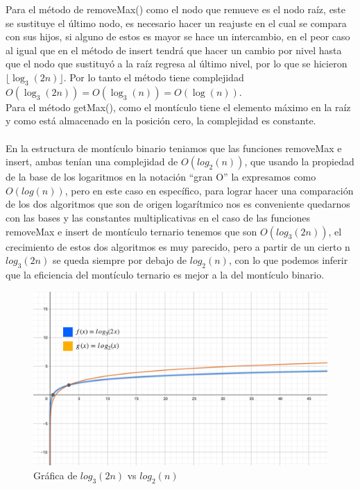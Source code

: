\documentclass[11pt]{article}
\begin{document}
\begin{enumerate}
\begin{itemize}
Para el método de removeMax() como el nodo que remueve es el nodo raíz, este se sustituye el último nodo, es necesario hacer un reajuste en el cual se  compara con sus hijos, si alguno de estos es mayor se hace un intercambio, en el peor caso al igual que en el método de insert tendrá que hacer un cambio por nivel hasta que el nodo que sustituyó a la raíz regresa al último nivel, por lo que se hicieron $\lfloor\log_3(2n)\rfloor$. Por lo tanto el método tiene complejidad $O(\log_3(2n))=O(\log_3(n))=O(\log(n))$. 
\\
Para el método getMax(), como el montículo tiene el elemento máximo en la raíz y como está almacenado en la posición cero, la complejidad es constante.
 \\
 \\En la estructura de montículo binario teniamos que las funciones removeMax e insert, ambas tenían una complejidad de $O(log_2 (n))$, que usando la propiedad de la base de los logaritmos en la notación “gran O”  la expresamos como $O(log(n))$, pero en este caso en específico, para lograr hacer una comparación de los dos algoritmos que son de origen logarítmico nos es conveniente quedarnos con las bases y las constantes multiplicativas en el caso de las funciones removeMax e insert de montículo ternario tenemos que son $O(log_3(2n))$, el crecimiento de estos dos algoritmos es muy parecido, pero a partir de un cierto n $log_3(2n)$ se queda siempre por debajo de $log_2(n)$, con lo que podemos inferir que la eficiencia del montículo ternario es mejor a la del montículo binario. 
 
   \begin{figure}[!h]
        \centering
        \includegraphics[scale=0.3]{IMG-2074 (1).jpg}
        \caption{Gráfica de $log_3(2n)$ vs $log_2(n)$}
    \end{figure}
    


\end{itemize}
\end{enumerate}
\end{document}
